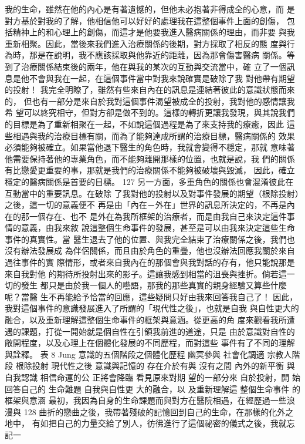 我的生命，雖然在他的內心是有著遺憾的，但他未必抱著非得成全的心意，而
是對方基於對我的了解，他相信他可以好好的處理我在這整個事件上面的創傷，
包括精神上的和心理上的創傷，而這才是他要我進入醫病關係的理由，而非要
與我重新相聚。因此，當後來我們進入治療關係的後期，對方採取了相反的態
度與行為時，那是在說明，我不應該採取與他靠近的距離，因為那會傷害醫病
關係。等到了治療關係結束後的兩年，他在與我的某次的互動與交流當中，確
立了一個訊息是他不會與我在一起，在這個事件當中對我來說確實是破除了我
對他帶有期望的投射！ 
我完全明瞭了，雖然有些來自內在的訊息是連結著彼此的意識狀態而來的，
但也有一部分是來自於我對這個事件渴望被成全的投射，我對他的感情讓我希
望可以終究相守，但對方卻是做不到的。這樣的轉折更讓我發現，與其說我們
的目標是為了重新相聚在一起，不如說這個過程是為了來支持我的療癒，因此
這些相遇與我的治療目標有關，而為了能夠達成所謂的治療目標，醫病關係的
效果必須能夠被確立。如果當他退下醫生的角色時，我就會變得不穩定，那就
意味著他需要保持著他的專業角色，而不能夠離開那樣的位置，也就是說，我
們的關係有比戀愛更重要的事，那就是我們的治療關係不能夠被破壞與毀滅，
因此，確立穩定的醫病關係是首要的目標。 
127 
另一方面，多重角色的關係也會混淆彼此在互動當中的重要訊息。在破除
了我對他的投射以及對事件發展的期望（根除投射）之後，這一切的意義便不
再是由「內在－外在」世界的訊息所決定的，不再是內在的那一個存在、也不
是外在為我所框架的治療者，而是由我自己來決定這件事情的意義，由我來敘
說這整個生命事件的發展，甚至是可以由我來決定這些生命事件的真實性。當
醫生退去了他的位置、與我完全結束了治療關係之後，我們也沒有辦法發展成
為伴侶關係，而且由於角色的重疊，他也沒辦法回應我關於來自過往事件的實
際情形，或者來自我內在的那個會與我對話的存有，他只能說那是來自我對他
的期待所投射出來的影子。這讓我感到相當的沮喪與挫折。倘若這一切的發生
都只是由於我一個人的囈語，那我的那些真實的親身經驗又算些什麼呢？當醫
生不再能給予恰當的回應，這些疑問只好由我來回答我自己了！ 
因此，我對這個事件的意識發展進入了所謂的「現代性之後」，也就是自我
與自性更大的融合，以及重新理解這整個生命事件的框架與意涵。從更高的角
度來觀看我所遭遇的課題，打從一開始就是個自性在引領我前進的道途，只是
由於意識對自性的敞開程度，以及心理上在個體化發展的不同歷程，而對這些
事件有了不同的理解與詮釋。 
表 8  
Jung 意識的五個階段之個體化歷程 
幽冥參與 社會化調適 宗教人階段 根除投射 現代性之後 
意識與記憶的
存在介於有與
沒有之間 
內外的新平衡
與自我認識 
相信命運的公
正將會降臨 
看見原來對期
望的一部分來
自於投射，開
始回答自己的
生命難題 
自我與自性更
大的融合，以
及重新理解這
整個生命事件
的框架與意涵 
最初，我因為自身的生命課題而與對方在醫院相遇，在經歷過一些浪漫與
128 
曲折的戀曲之後，我帶著殘破的記憶回到自己的生命，在那樣的化外之地中，
有如把自己的力量交給了別人，彷彿進行了這個祕密的儀式之後，我就忘記一
